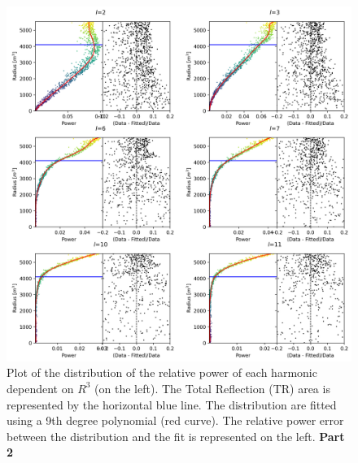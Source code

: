 \documentclass[../main.tex]{subfiles}
\begin{document}
\begin{figure}[ht]
  \centering
  \includegraphics[width=\linewidth]{images/jgnn/harmonic/power_fit_pt2.png}
  \caption{Plot of the distribution of the relative power of each harmonic dependent on $R^3$ (on the left). The Total Reflection (TR) area is represented by the horizontal blue line. The distribution are fitted using a 9th degree polynomial (red curve). The relative power error between the distribution and the fit is represented on the left. \textbf{Part 2}}
  \label{fig:annex:jgnn:harmonic:fit2}
\end{figure}
\end{document}
